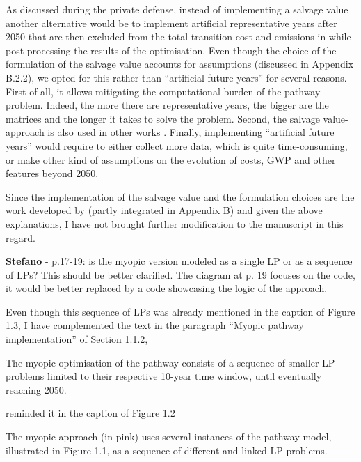 \documentclass[12pt,a4paper]{article}
\begin{document}
As discussed during the private defense, instead of implementing a salvage value another alternative would be to implement artificial representative years after 2050 that are then excluded from the total transition cost and emissions in while post-processing the results of the optimisation. Even though the choice of the formulation of the salvage value accounts for assumptions (discussed in Appendix B.2.2), we opted for this rather than ``artificial future years'' for several reasons. First of all, it allows mitigating the computational burden of the pathway problem. Indeed, the more there are representative years, the bigger are the matrices and the longer it takes to solve the problem. Second, the salvage value-approach is also used in other works \cite{poncelet2016myopic,prina2019transition}. Finally, implementing ``artificial  future years'' would require to either collect more data, which is quite time-consuming, or make other kind of assumptions on the evolution of costs, GWP and other features beyond 2050.

Since the implementation of the salvage value and the formulation choices are the work developed by \citet{limpens2024pathway} (partly integrated in Appendix B) and given the above explanations, I have not brought further modification to the manuscript in this regard.

\begin{mdframed}[style=comment] %
{\color{orange} \textbf{Stefano}} - p.17-19: is the myopic version modeled as a single LP or as a sequence of LPs? This should be better clarified. The diagram at p. 19 focuses on the code, it would be better replaced by a code showcasing the logic of the approach.
\end{mdframed}

\noindent Even though this sequence of LPs was already mentioned {\color{blue}in the caption of Figure 1.3}, I have complemented the text {\color{blue} in the paragraph ``Myopic pathway implementation'' of Section 1.1.2}, 

\begin{mdframed}[style=manuscript] %
[...] The myopic optimisation of the pathway consists of a sequence of smaller LP problems limited to their respective 10-year time window, until eventually reaching 2050.
\end{mdframed}

\noindent reminded it in the caption of Figure 1.2

\begin{mdframed}[style=manuscript] %
The myopic approach (in pink) uses several instances of the pathway model, illustrated in Figure 1.1, as a sequence of different and linked LP problems. 
\end{mdframed}
\end{document}
